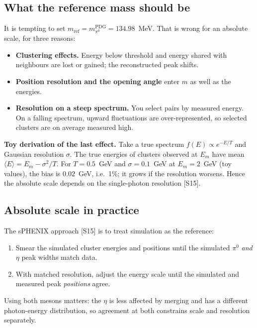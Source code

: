 \documentclass[11pt,letterpaper]{article}
\begin{document}
\subsection{What the reference mass should be}
It is tempting to set $m_{\mathrm{ref}}=m_{\pi^0}^{\mathrm{PDG}}=134.98$~MeV. That is wrong for an absolute scale, for three reasons:
\begin{itemize}
\item \textbf{Clustering effects.} Energy below threshold and energy shared with neighbours are lost or gained; the reconstructed peak shifts.
\item \textbf{Position resolution and the opening angle} enter $m$ as well as the energies.
\item \textbf{Resolution on a steep spectrum.} You select pairs by measured energy. On a falling spectrum, upward fluctuations are over-represented, so selected clusters are on average measured high.
\end{itemize}
\textbf{Toy derivation of the last effect.} Take a true spectrum $f(E)\propto e^{-E/T}$ and Gaussian resolution $\sigma$. The true energies of clusters observed at $E_m$ have mean
$\langle E\rangle = E_m - \sigma^2/T$. For $T=0.5$~GeV and $\sigma=0.1$~GeV at $E_m=2$~GeV (toy values), the bias is $0.02$~GeV, i.e.\ 1\%; it grows if the resolution worsens.
Hence the absolute scale depends on the single-photon resolution [S15].

\subsection{Absolute scale in practice}
The sPHENIX approach [S15] is to treat simulation as the reference:
\begin{enumerate}
\item Smear the simulated cluster energies and positions until the simulated $\pi^0$ \emph{and} $\eta$ peak widths match data.
\item With matched resolution, adjust the energy scale until the simulated and measured peak \emph{positions} agree.
\end{enumerate}
Using both mesons matters: the $\eta$ is less affected by merging and has a different photon-energy distribution, so agreement at both constrains scale and resolution separately.
\end{document}
